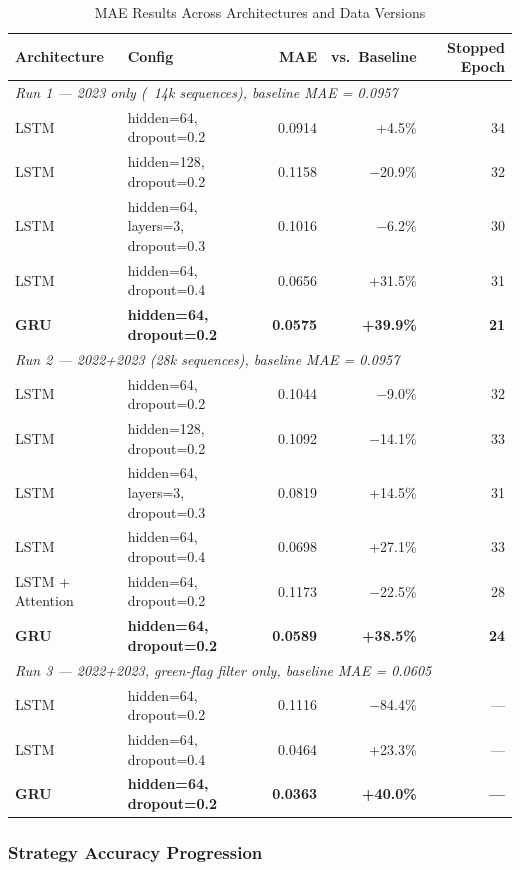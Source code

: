 \documentclass[12pt]{article}
\begin{document}
\begin{table}[h]
\centering
\caption{MAE Results Across Architectures and Data Versions}
\label{tab:architectures}
\begin{tabular}{llrrr}
\toprule
Architecture & Config & MAE & vs.\ Baseline & Stopped Epoch \\
\midrule
\multicolumn{5}{l}{\textit{Run 1 — 2023 only (~14k sequences), baseline MAE = 0.0957}} \\
LSTM & hidden=64, dropout=0.2 & 0.0914 & +4.5\% & 34 \\
LSTM & hidden=128, dropout=0.2 & 0.1158 & $-$20.9\% & 32 \\
LSTM & hidden=64, layers=3, dropout=0.3 & 0.1016 & $-$6.2\% & 30 \\
LSTM & hidden=64, dropout=0.4 & 0.0656 & +31.5\% & 31 \\
\textbf{GRU} & \textbf{hidden=64, dropout=0.2} & \textbf{0.0575} & \textbf{+39.9\%} & \textbf{21} \\
\midrule
\multicolumn{5}{l}{\textit{Run 2 — 2022+2023 (28k sequences), baseline MAE = 0.0957}} \\
LSTM & hidden=64, dropout=0.2 & 0.1044 & $-$9.0\% & 32 \\
LSTM & hidden=128, dropout=0.2 & 0.1092 & $-$14.1\% & 33 \\
LSTM & hidden=64, layers=3, dropout=0.3 & 0.0819 & +14.5\% & 31 \\
LSTM & hidden=64, dropout=0.4 & 0.0698 & +27.1\% & 33 \\
LSTM + Attention & hidden=64, dropout=0.2 & 0.1173 & $-$22.5\% & 28 \\
\textbf{GRU} & \textbf{hidden=64, dropout=0.2} & \textbf{0.0589} & \textbf{+38.5\%} & \textbf{24} \\
\midrule
\multicolumn{5}{l}{\textit{Run 3 — 2022+2023, green-flag filter only, baseline MAE = 0.0605}} \\
LSTM & hidden=64, dropout=0.2 & 0.1116 & $-$84.4\% & — \\
LSTM & hidden=64, dropout=0.4 & 0.0464 & +23.3\% & — \\
\textbf{GRU} & \textbf{hidden=64, dropout=0.2} & \textbf{0.0363} & \textbf{+40.0\%} & \textbf{—} \\
\bottomrule
\end{tabular}
\end{table}

\subsubsection{Strategy Accuracy Progression}
\end{document}
